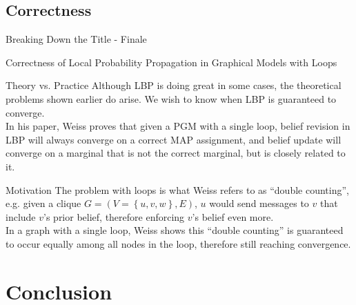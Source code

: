 \documentclass{beamer}
\begin{document}
\subsection{Correctness}
\begin{frame}{Breaking Down the Title - Finale}
    \begin{center}
        \Large{\alert<2>{Correctness} of Local Probability Propagation in Graphical Models with \alert<1>{Loops}}
    \end{center}
\end{frame}
\begin{frame}
    \begin{block}{Theory vs. Practice}
        Although LBP is doing great in some cases, the theoretical problems shown earlier do arise. We wish to know when LBP is guaranteed to converge.\\
        In his paper, Weiss proves that given a PGM with a single loop, belief revision in LBP will always converge on a correct MAP assignment, and belief update will converge on a marginal that is not the correct marginal, but is closely related to it.
    \end{block}
\end{frame}
\begin{frame}
    \begin{block}{Motivation}
        The problem with loops is what Weiss refers to as ``double counting'', e.g. given a clique $ G = \left( V = \left\{ u, v, w \right\}, E \right) $, $ u $ would send messages to $ v $ that include $ v $'s prior belief, therefore enforcing $ v $'s belief even more.\\
        In a graph with a single loop, Weiss shows this ``double counting'' is guaranteed to occur equally among all nodes in the loop, therefore still reaching convergence.
    \end{block}    
\end{frame}
\section{Conclusion}
\end{document}
